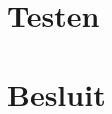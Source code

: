 \documentclass[a4paper,11pt]{article}
\begin{document}
\section{Testen}

\section{Besluit}\label{sec:besluit}









\end{document}
